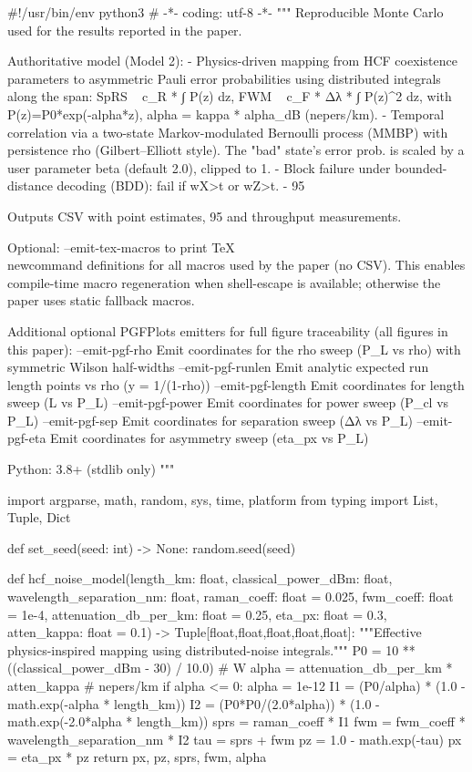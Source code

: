 #!/usr/bin/env python3
# -*- coding: utf-8 -*-
"""
Reproducible Monte Carlo used for the results reported in the paper.

Authoritative model (Model 2):
  - Physics-driven mapping from HCF coexistence parameters to asymmetric Pauli
    error probabilities using distributed integrals along the span:
      SpRS ~ c_R * ∫ P(z) dz,  FWM ~ c_F * Δλ * ∫ P(z)^2 dz,
    with P(z)=P0*exp(-alpha*z), alpha = kappa * alpha_dB (nepers/km).
  - Temporal correlation via a two-state Markov-modulated Bernoulli process (MMBP)
    with persistence rho (Gilbert--Elliott style). The "bad" state's error prob.
    is scaled by a user parameter beta (default 2.0), clipped to 1.
  - Block failure under bounded-distance decoding (BDD): fail if wX>t or wZ>t.
  - 95%

Outputs CSV with point estimates, 95%
and throughput measurements.

Optional: --emit-tex-macros to print TeX \\newcommand definitions for all macros
used by the paper (no CSV). This enables compile-time macro regeneration when
shell-escape is available; otherwise the paper uses static fallback macros.

Additional optional PGFPlots emitters for full figure traceability (all figures in this paper):
  --emit-pgf-rho         Emit coordinates for the rho sweep (P_L vs rho) with symmetric Wilson half-widths
  --emit-pgf-runlen      Emit analytic expected run length points vs rho (y = 1/(1-rho))
  --emit-pgf-length      Emit coordinates for length sweep (L vs P_L)
  --emit-pgf-power       Emit coordinates for power sweep (P_cl vs P_L)
  --emit-pgf-sep         Emit coordinates for separation sweep (Δλ vs P_L)
  --emit-pgf-eta         Emit coordinates for asymmetry sweep (eta_px vs P_L)

Python: 3.8+ (stdlib only)
"""

import argparse, math, random, sys, time, platform
from typing import List, Tuple, Dict

def set_seed(seed: int) -> None:
    random.seed(seed)

def hcf_noise_model(length_km: float,
                    classical_power_dBm: float,
                    wavelength_separation_nm: float,
                    raman_coeff: float = 0.025,
                    fwm_coeff: float = 1e-4,
                    attenuation_db_per_km: float = 0.25,
                    eta_px: float = 0.3,
                    atten_kappa: float = 0.1) -> Tuple[float,float,float,float,float]:
    """Effective physics-inspired mapping using distributed-noise integrals."""
    P0 = 10 ** ((classical_power_dBm - 30) / 10.0)  # W
    alpha = attenuation_db_per_km * atten_kappa     # nepers/km
    if alpha <= 0:
        alpha = 1e-12
    I1 = (P0/alpha) * (1.0 - math.exp(-alpha * length_km))
    I2 = (P0*P0/(2.0*alpha)) * (1.0 - math.exp(-2.0*alpha * length_km))
    sprs = raman_coeff * I1
    fwm  = fwm_coeff  * wavelength_separation_nm * I2
    tau = sprs + fwm
    pz = 1.0 - math.exp(-tau)
    px = eta_px * pz
    return px, pz, sprs, fwm, alpha

